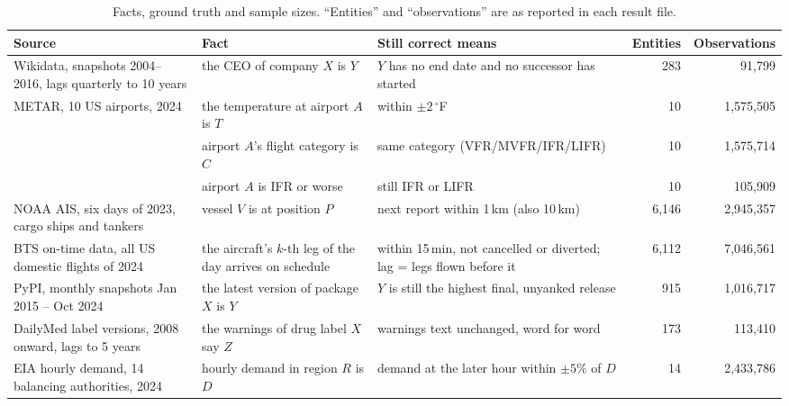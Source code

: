 \begin{table}[t]
\centering
\small
\caption{Facts, ground truth and sample sizes. ``Entities'' and
``observations'' are as reported in each result file.}
\label{tab:datasets}
\begin{tabular}{p{2.6cm}p{3.6cm}p{3.2cm}rr}
\toprule
Source & Fact & Still correct means & Entities & Observations \\
\midrule
Wikidata, snapshots 2004--2016, lags quarterly to 10 years
  & the CEO of company $X$ is $Y$
  & $Y$ has no end date and no successor has started
  & 283 & 91{,}799 \\
METAR, 10 US airports, 2024
  & the temperature at airport $A$ is $T$
  & within $\pm 2\,^\circ$F
  & 10 & 1{,}575{,}505 \\
  & airport $A$'s flight category is $C$
  & same category (VFR/MVFR/IFR/LIFR)
  & 10 & 1{,}575{,}714 \\
  & airport $A$ is IFR or worse
  & still IFR or LIFR
  & 10 & 105{,}909 \\
NOAA AIS, six days of 2023, cargo ships and tankers
  & vessel $V$ is at position $P$
  & next report within 1\,km (also 10\,km)
  & 6{,}146 & 2{,}945{,}357 \\
BTS on-time data, all US domestic flights of 2024
  & the aircraft's $k$-th leg of the day arrives on schedule
  & within 15\,min, not cancelled or diverted; lag = legs flown before it
  & 6{,}112 & 7{,}046{,}561 \\
PyPI, monthly snapshots Jan 2015 -- Oct 2024
  & the latest version of package $X$ is $Y$
  & $Y$ is still the highest final, unyanked release
  & 915 & 1{,}016{,}717 \\
DailyMed label versions, 2008 onward, lags to 5 years
  & the warnings of drug label $X$ say $Z$
  & warnings text unchanged, word for word
  & 173 & 113{,}410 \\
EIA hourly demand, 14 balancing authorities, 2024
  & hourly demand in region $R$ is $D$
  & demand at the later hour within $\pm 5\%$ of $D$
  & 14 & 2{,}433{,}786 \\
\bottomrule
\end{tabular}
\end{table}

